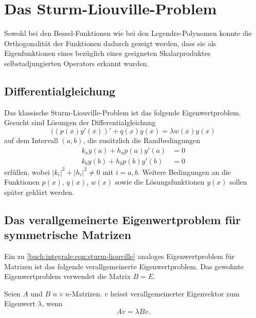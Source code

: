 %
%
%
\section{Das Sturm-Liouville-Problem
\label{buch:integrale:subsection:sturm-liouville-problem}}
Sowohl bei den Bessel-Funktionen wie bei den Legendre-Polynomen
konnte die Orthogonalität der Funktionen dadurch gezeigt werden,
dass sie als Eigenfunktionen eines bezüglich eines geeigneten
Skalarproduktes selbstadjungierten Operators erkannt wurden.

\subsection{Differentialgleichung}
Das klassische Sturm-Liouville-Problem ist das folgende Eigenwertproblem.
Gesucht sind Lösungen der Differentialgleichung
\begin{equation}
((p(x)y'(x))' + q(x)y(x) = \lambda w(x) y(x)
\label{buch:integrale:eqn:sturm-liouville}
\end{equation}
auf dem Intervall $(a,b)$, die zusätzlich die Randbedingungen
\begin{equation}
\begin{aligned}
k_a y(a) + h_a p(a) y'(a) &= 0 \\
k_b y(b) + h_b p(b) y'(b) &= 0
\end{aligned}
\label{buch:integrale:sturm:randbedingung}
\end{equation}
erfüllen, wobei $|k_i|^2 + |h_i|^2\ne 0$ mit $i=a,b$.
Weitere Bedingungen an die Funktionen $p(x)$, $q(x)$, $w(x)$  sowie die
Lösungsfunktionen $y(x)$ sollen später geklärt werden.

\subsection{Das verallgemeinerte Eigenwertproblem für symmetrische Matrizen}
Ein zu \eqref{buch:integrale:eqn:sturm-liouville} analoges Eigenwertproblem
für Matrizen ist das folgende verallgemeinerte Eigenwertproblem.
Das gewohnte Eigenwertproblem verwendet die Matrix $B=E$.

\begin{definition}
Seien $A$ und $B$ $n\times n$-Matrizen.
$v$ heisst verallgemeinerter Eigenvektor zum Eigenwert $\lambda$,
wenn
\[
Av = \lambda Bv.
\]
\end{definition}

